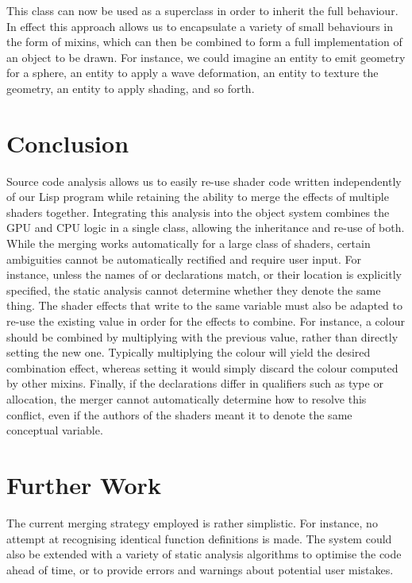\documentclass{sig-alternate}
\begin{document}
This  class can now be used as a superclass in order to inherit the full behaviour. In effect this approach allows us to encapsulate a variety of small behaviours in the form of mixins, which can then be combined to form a full implementation of an object to be drawn. For instance, we could imagine an entity to emit geometry for a sphere, an entity to apply a wave deformation, an entity to texture the geometry, an entity to apply shading, and so forth.

\section{Conclusion}\label{section:5}
Source code analysis allows us to easily re-use shader code written independently of our Lisp program while retaining the ability to merge the effects of multiple shaders together. Integrating this analysis into the object system combines the GPU and CPU logic in a single class, allowing the inheritance and re-use of both. \\

While the merging works automatically for a large class of shaders, certain ambiguities cannot be automatically rectified and require user input. For instance, unless the names of  or  declarations match, or their location is explicitly specified, the static analysis cannot determine whether they denote the same thing. The shader effects that write to the same  variable must also be adapted to re-use the existing value in order for the effects to combine. For instance, a colour should be combined by multiplying with the previous value, rather than directly setting the new one. Typically multiplying the colour will yield the desired combination effect, whereas setting it would simply discard the colour computed by other mixins. Finally, if the declarations differ in qualifiers such as type or allocation, the merger cannot automatically determine how to resolve this conflict, even if the authors of the shaders meant it to denote the same conceptual variable.

\section{Further Work}\label{section:6}
The current merging strategy employed is rather simplistic. For instance, no attempt at recognising identical function definitions is made. The system could also be extended with a variety of static analysis algorithms to optimise the code ahead of time, or to provide errors and warnings about potential user mistakes. \\
\end{document}
